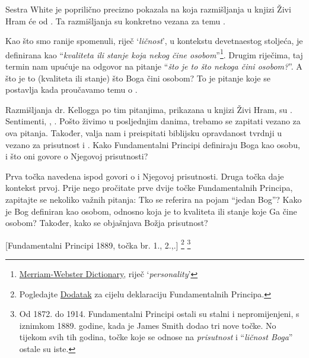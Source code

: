 Sestra White je poprilično precizno pokazala na koja razmišljanja u knjizi Živi Hram će  od . Ta razmišljanja su konkretno vezana za temu .

Kao što smo ranije spomenuli, riječ ‘\textit{ličnost}’, u kontekstu devetnaestog stoljeća, je definirana kao “\textit{kvaliteta ili stanje koja nekog čine osobom}”\footnote{\href{https://www.merriam-webster.com/dictionary/personality}{Merriam-Webster Dictionary}, riječ ‘\textit{personality}’}. Drugim riječima, taj termin nam upućuje na odgovor na pitanje “\textit{što je to što nekoga čini osobom?}”. A što je to (kvaliteta ili stanje) što Boga čini osobom? To je pitanje koje se postavlja kada proučavamo temu o .

Razmišljanja dr. Kellogga po tim pitanjima, prikazana u knjizi Živi Hram, su . Sentimenti, , . Pošto živimo u posljednjim danima, trebamo se zapitati vezano za ova pitanja. Također, valja nam i preispitati biblijsku opravdanost tvrdnji u  vezano za prisutnost i . Kako Fundamentalni Principi definiraju Boga kao osobu, i što oni govore o Njegovoj prisutnosti?

Prva točka navedena ispod govori o  i Njegovoj prisutnosti. Druga točka daje kontekst prvoj. Prije nego pročitate prve dvije točke Fundamentalnih Principa, zapitajte se nekoliko važnih pitanja: Tko se referira na pojam “jedan Bog”? Kako je Bog definiran kao osobom, odnosno koja je to kvaliteta ili stanje koje Ga čine osobom? Također, kako se objašnjava Božja prisutnost?


[Fundamentalni Principi 1889, točka br. 1., 2.,.] \footnote{Pogledajte \hyperref[chap:appendix]{Dodatak} za cijelu deklaraciju Fundamentalnih Principa.} \footnote{Od 1872. do 1914. Fundamentalni Principi ostali su stalni i nepromijenjeni, s iznimkom 1889. godine, kada je James Smith dodao tri nove točke. No tijekom svih tih godina, točke koje se odnose na \textit{prisutnost} i “\textit{ličnost Boga}” ostale su iste.}

